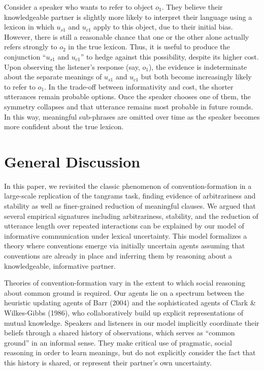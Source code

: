 \documentclass[manuscript]{stjour}
\begin{document}
Consider a speaker who wants to refer to object \(o_1\). They believe
their knowledgeable partner is slightly more likely to interpret their
language using a lexicon in which \(u_{s1}\) and \(u_{c1}\) apply to
this object, due to their initial bias. However, there is still a
reasonable chance that one or the other alone actually refers strongly
to \(o_2\) in the true lexicon. Thus, it is useful to produce the
conjunction ``\(u_{s1}\) and \(u_{c1}\)'' to hedge against this
possibility, despite its higher cost. Upon observing the listener's
response (say, \(o_1\)), the evidence is indeterminate about the
separate meanings of \(u_{s1}\) and \(u_{c1}\) but both become
increasingly likely to refer to \(o_1\). In the trade-off between
informativity and cost, the shorter utterances remain probable options.
Once the speaker chooses one of them, the symmetry collapses and that
utterance remains most probable in future rounds. In this way,
meaningful sub-phrases are omitted over time as the speaker becomes more
confident about the true lexicon.

\section{General Discussion}\label{general-discussion}

In this paper, we revisited the classic phenomenon of
convention-formation in a large-scale replication of the tangrams task,
finding evidence of arbitrariness and stability as well as finer-grained
reduction of meaningful clauses. We argued that several empirical
signatures including arbitrariness, stability, and the reduction of
utterance length over repeated interactions can be explained by our
model of informative communication under lexical uncertainty. This model
formalizes a theory where conventions emerge via initially uncertain
agents assuming that conventions are already in place and inferring them
by reasoning about a knowledgeable, informative partner.

Theories of convention-formation vary in the extent to which social
reasoning about common ground is required. Our agents lie on a spectrum
between the heuristic updating agents of Barr (2004) and the
sophisticated agents of Clark \& Wilkes-Gibbs (1986), who
collaboratively build up explicit representations of mutual knowledge.
Speakers and listeners in our model implicitly coordinate their beliefs
through a shared history of observations, which serves as ``common
ground'' in an informal sense. They make critical use of pragmatic,
social reasoning in order to learn meanings, but do not explicitly
consider the fact that this history is shared, or represent their
partner's own uncertainty.
\end{document}
